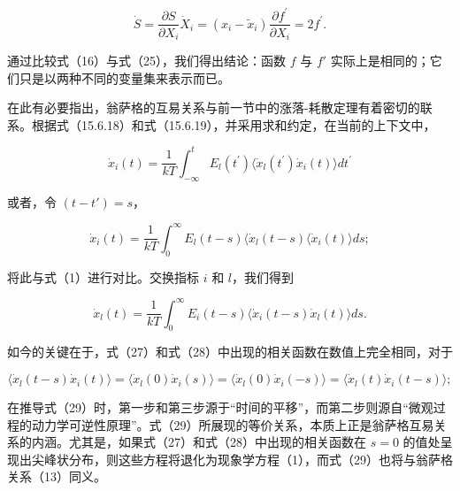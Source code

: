 \begin{equation}\tag{15.6.53}\label{eq:15.6.53}
\dot { S } = \frac { \partial S } { \partial X _ { i } } \dot { X } _ { i } = ( x _ { i } - \tilde { x } _ { i } ) \frac { \partial f ^{\prime} } { \partial X _ { i } } = 2 f ^{\prime} .
\end{equation}

通过比较式（16）与式（25），我们得出结论：函数 \(f\) 与 \(f'\) 实际上是相同的；它们只是以两种不同的变量集来表示而已。

在此有必要指出，翁萨格的互易关系与前一节中的涨落-耗散定理有着密切的联系。根据式（15.6.18）和式（15.6.19），并采用求和约定，在当前的上下文中，

\begin{equation}\tag{15.6.54}\label{eq:15.6.54}
\dot { x } _ { i } ( t ) = \frac { 1 } { k T } \int _ { - \infty } ^{t} E _ { l } ( t ^{\prime} ) \langle \dot { x } _ { l } ( t ^{\prime} ) \dot { x } _ { i } ( t ) \rangle d t ^{\prime}
\end{equation}

或者，令 \((t-t')=s\)，

\begin{equation}\tag{15.6.55}\label{eq:15.6.55}
\dot { x } _ { i } ( t ) = \frac { 1 } { k T } \int _ { 0 } ^{\infty} E _ { l } ( t - s ) \langle \dot { x } _ { l } ( t - s ) \langle \dot { x } _ { i } ( t ) \rangle d s ;
\end{equation}

将此与式（1）进行对比。交换指标 \(i\) 和 \(l\)，我们得到

\begin{equation}\tag{15.6.56}\label{eq:15.6.56}
\dot { x } _ { l } ( t ) = \frac { 1 } { k T } \int _ { 0 } ^{\infty} E _ { i } ( t - s ) \langle \dot { x } _ { i } ( t - s ) \dot { x } _ { l } ( t ) \rangle d s .
\end{equation}

如今的关键在于，式（27）和式（28）中出现的相关函数在数值上完全相同，对于

\begin{equation}\tag{15.6.57}\label{eq:15.6.57}
\langle \dot { x } _ { l } ( t - s ) \dot { x } _ { i } ( t ) \rangle = \langle \dot { x } _ { l } ( 0 ) \dot { x } _ { i } ( s ) \rangle = \langle \dot { x } _ { l } ( 0 ) \dot { x } _ { i } ( - s ) \rangle = \langle \dot { x } _ { l } ( t ) \dot { x } _ { i } ( t - s ) \rangle ;
\end{equation}

在推导式（29）时，第一步和第三步源于``时间的平移''，而第二步则源自``微观过程的动力学可逆性原理''。式（29）所展现的等价关系，本质上正是翁萨格互易关系的内涵。尤其是，如果式（27）和式（28）中出现的相关函数在 \(s=0\) 的值处呈现出尖峰状分布，则这些方程将退化为现象学方程（1），而式（29）也将与翁萨格关系（13）同义。

